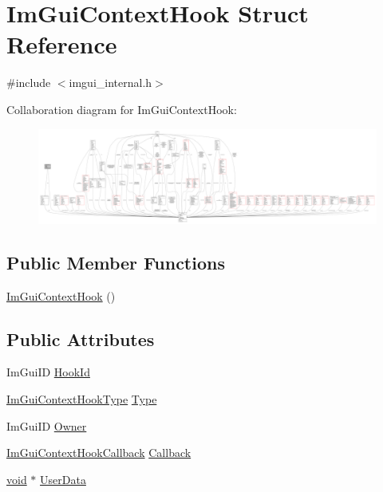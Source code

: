 \hypertarget{structImGuiContextHook}{}\section{Im\+Gui\+Context\+Hook Struct Reference}
\label{structImGuiContextHook}


{\ttfamily \#include $<$imgui\+\_\+internal.\+h$>$}



Collaboration diagram for Im\+Gui\+Context\+Hook\+:
\nopagebreak
\begin{figure}[H]
\begin{center}
\leavevmode
\includegraphics[width=350pt]{structImGuiContextHook__coll__graph}
\end{center}
\end{figure}
\subsection*{Public Member Functions}
\begin{DoxyCompactItemize}
\item 
\hyperlink{structImGuiContextHook_aa6179093519760cda23818d58d0b040f}{Im\+Gui\+Context\+Hook} ()
\end{DoxyCompactItemize}
\subsection*{Public Attributes}
\begin{DoxyCompactItemize}
\item 
Im\+Gui\+ID \hyperlink{structImGuiContextHook_ac97fa11f1ba8c8ff04c1ede25437ecdf}{Hook\+Id}
\item 
\hyperlink{imgui__internal_8h_a00ee5484f4006a8b98ed323d1dc37944}{Im\+Gui\+Context\+Hook\+Type} \hyperlink{structImGuiContextHook_a86f1cb04f4624448c9a508f6d299c2f9}{Type}
\item 
Im\+Gui\+ID \hyperlink{structImGuiContextHook_a7b6ce62215c093535dd36c4a1303befc}{Owner}
\item 
\hyperlink{imgui__internal_8h_aa99029b7d107c7769178a5ca13ddfa6f}{Im\+Gui\+Context\+Hook\+Callback} \hyperlink{structImGuiContextHook_ac95bc416ed24b5ad3cfa7c2199adcaf9}{Callback}
\item 
\hyperlink{imgui__impl__opengl3__loader_8h_ac668e7cffd9e2e9cfee428b9b2f34fa7}{void} $\ast$ \hyperlink{structImGuiContextHook_a334cf9cae105a3636f13aa1f2bc25e60}{User\+Data}
\end{DoxyCompactItemize}


